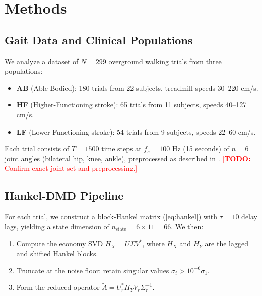 \documentclass[12pt]{article}
\newcommand{\Atilde}{\tilde{A}}
\newcommand{\todo}[1]{\textcolor{red}{[\textbf{TODO:} #1]}}
\begin{document}
\section{Methods}
\label{sec:methods}

\subsection{Gait Data and Clinical Populations}
\label{sec:data}

We analyze a dataset of $N = 299$ overground walking trials from three
populations:
\begin{itemize}
  \item \textbf{AB} (Able-Bodied): 180 trials from 22 subjects, treadmill
  speeds 30--220 cm/s.
  \item \textbf{HF} (Higher-Functioning stroke): 65 trials from 11
  subjects, speeds 40--127 cm/s.
  \item \textbf{LF} (Lower-Functioning stroke): 54 trials from 9 subjects,
  speeds 22--60 cm/s.
\end{itemize}
Each trial consists of $T = 1500$ time steps at $f_s = 100$ Hz (15 seconds)
of $n = 6$ joint angles (bilateral hip, knee, ankle), preprocessed as
described in \citet{winner2023lstm}. \todo{Confirm exact joint set and
preprocessing.}

\subsection{Hankel-DMD Pipeline}
\label{sec:pipeline}

For each trial, we construct a block-Hankel matrix (\cref{eq:hankel}) with
$\tau = 10$ delay lags, yielding a state dimension of
$n_{\text{state}} = 6 \times 11 = 66$. We then:

\begin{enumerate}
  \item Compute the economy SVD $H_X = U \Sigma V^*$, where
  $H_X$ and $H_Y$ are the lagged and shifted Hankel blocks.
  \item Truncate at the noise floor: retain singular values
  $\sigma_i > 10^{-6} \sigma_1$.
  \item Form the reduced operator
  $\Atilde = U_r^* H_Y V_r \Sigma_r^{-1}$.
\end{enumerate}
\end{document}
